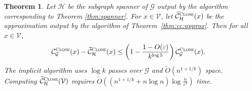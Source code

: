 \documentclass{report}
\newtheorem{theorem}{Theorem}[section]
\newcommand{\algoname}[1]{\textnormal{\textsc{#1}}}
\begin{document}
%
\begin{theorem} \label{thm:cc:sstream:approx:light}
Let $\mathcal{H}$ be the subgraph spanner of $\mathcal{G}$ output by the algorithm corresponding to Theorem \ref{thm:spanner}.
For $x \in \mathcal{V}$, let $\widetilde{\mathcal{C}}^{\algoname{Close}}_{\mathcal{H}}(x)$ be the approximation output by the algorithm of Theorem~\ref{thm:cc:approx}. 
Then for all $x \in \mathcal{V}$,
%
\begin{equation} \label{eq:spanner:cc:light}
\mathcal{C}^{\algoname{Close}}_{\mathcal{G}}(x) - \widetilde{\mathcal{C}}^{\algoname{Close}}_{\mathcal{H}}(x) \leq \left ( 1 - \frac{1 - O(\varepsilon)}{k^{\log 5}} \right ) \mathcal{C}^{\algoname{Close}}_{\mathcal{G}}(x).
\end{equation}
%
The implicit algorithm uses $\log k$ passes over $\mathcal{G}$ and $\widetilde{O}(n^{1 + 1/k})$ space.
Computing $\widetilde{\mathcal{C}}^{\algoname{Close}}_{\mathcal{H}}(\mathcal{V})$ requires $\widetilde{O} \left ( \left (n^{1 + 1/k} + n \log n \right )\log \frac{n}{\varepsilon^3} \right )$ time.
\end{theorem}

 
\end{document}
